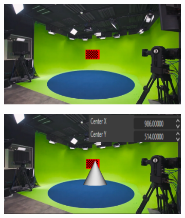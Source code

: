 \begin{figure}[h]
    \centering
    \begin{subfigure}[b]{0.45\textwidth}
        \includegraphics[width=\textwidth]{Images/04calibration/1.png}
        \caption{}
        \label{fig:a}
    \end{subfigure}
    \hfill
    \begin{subfigure}[b]{0.45\textwidth}
        \includegraphics[width=\textwidth]{Images/04calibration/2.png}
        \caption{}
        \label{fig:b}
    \end{subfigure}
    
    \vspace{0.5cm}
    

\end{figure}
